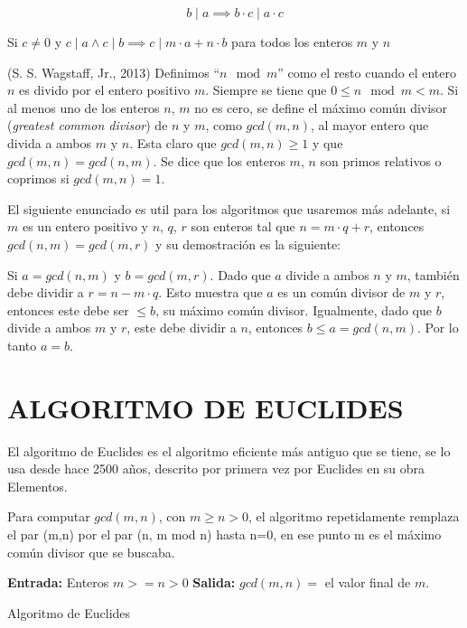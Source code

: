 \documentclass[12pt,letterpaper]{book}
\begin{document}
    \[
        b \mid a \implies b\cdot c \mid a\cdot c
    \]
    
    Si $c\not = 0$ y $c \mid a \land c \mid b \implies c\mid m\cdot a + n\cdot b$ para todos los enteros $m$ y $n$

    (S. S. Wagstaff, Jr., 2013) Definimos “$n \mod m$” como el resto cuando el entero $n$ es divido por el entero positivo $m$. Siempre se tiene que $0 \leq n \mod m < m$.
    Si al menos uno de los enteros $n$, $m$ no es cero, se define el máximo común divisor (\textit{greatest common divisor}) de $n$ y $m$, como $gcd(m,n)$, al mayor entero que divida a ambos $m$ y $n$. Esta claro que $gcd(m,n) \geq 1$ y que $gcd(m,n) = gcd(n,m)$. Se dice que los enteros $m$, $n$ son primos relativos o coprimos si $gcd(m,n) = 1$.

    El siguiente enunciado es util para los algoritmos que usaremos más adelante, si $m$ es un entero positivo y $n$, $q$, $r$ son enteros tal que $n = m\cdot q + r$, entonces $gcd(n,m) = gcd(m,r)$ y su demostración es la siguiente:

    Si $a = gcd(n,m)$ y $b=gcd(m,r)$. Dado que $a$ divide a ambos $n$ y $m$, también debe dividir a $r =n-m\cdot q$. Esto muestra que $a$ es un común divisor de $m$ y $r$, entonces este debe ser $\leq b$, su máximo común divisor. Igualmente, dado que $b$ divide a ambos $m$ y $r$, este debe dividir a $n$, entonces $b \leq a = gcd(n,m)$. Por lo tanto $a = b$.

    \section{ALGORITMO DE EUCLIDES}
    El algoritmo de Euclides es el algoritmo eficiente más antiguo que se tiene, se lo usa desde hace 2500 años, descrito por primera vez por Euclides en su obra Elementos.

    Para computar $gcd(m,n)$, con $m\geq n > 0$, el algoritmo repetidamente remplaza el par (m,n) por el par (n, m mod n) hasta n=0, en ese punto m es el máximo común divisor que se buscaba.
    
    \begin{algorithm}[H]
        \SetAlgoLined
        \textbf{Entrada:} Enteros $m >= n > 0$ \;
         \textbf{Salida:} $gcd(m,n)=$ el valor final de $m$.\ 
         \caption{Algoritmo de Euclides}
    \end{algorithm}
\end{document}
